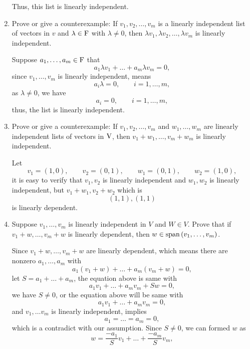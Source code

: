 \begin{enumerate}
\begin{solution}
            Thus, this list is linearly independent.
        \end{solution}
    \item Prove or give a counterexample: If $v_1, v_2, \ldots, v_m$ is a linearly independent list of vectors in $v$ and $\lambda \in \mathrm{F}$ with 
        $\lambda \neq 0$, then $\lambda v_1, \lambda v_2, \ldots, \lambda v_m$ is linearly independent.
        \begin{solution}
            Suppose $a_1, \ldots, a_m \in \mathrm{F}$ that 
            \[ a_1\lambda v_1 + \dots + a_m \lambda v_m = 0,\]
            since $v_1, \ldots, v_m$ is linearly independent, means 
            \[a_i\lambda = 0, \qquad i = 1, \ldots, m,\]
            as $\lambda \neq 0$, we have 
            \[ a_i =0, \qquad i=1,\ldots,m,\]
            thus, the list is linearly independent.
        \end{solution}
    \item Prove or give a counterexample: If $v_1, v_2, \ldots, v_m$ and $w_1, \ldots, w_m$ are linearly independent lists of vectors in $\mathrm{V}$,
        then $v_1 + w_1, \ldots, v_m + w_m$ is linearly independent.
        \begin{solution}
            Let 
            \[ v_1 = (1,0), \qquad v_2 = (0,1), \qquad w_1=(0,1), \qquad w_2=(1,0),\]
            it is easy to verify that $v_1, v_2$ is linearly independent and $w_1, w_2$ is linearly independent,
            but $v_1+w_1, v_2+w_2$ which is 
            \[ (1,1), (1,1)\]
            is linearly dependent.
        \end{solution}
    \item Suppose $v_1, \ldots, v_m$ is linearly independent in $V$ and $W \in V$. Prove that if $v_1 + w, \ldots, v_m +w$ is linearly dependent, 
        then $w \in \text{span}\left(v_1,\ldots,v_m\right)$.
        \begin{solution}
            Since $v_1 + w, \ldots, v_m + w$ are linearly dependent, which means there are nonzero $a_1, \ldots, a_m$ with 
            \[ a_1(v_1+w) + \dots + a_m(v_m + w)  = 0,\]
            let $S = a_1 + \dots + a_m$, the equation above is same with 
            \[ a_1v_1 + \dots + a_m v_m + Sw = 0,\]
            we have $S \neq 0$, or the equation above will be same with 
            \[ a_1 v_1 + \dots + a_mv_m = 0,\]
            and $v_1, \ldots v_m$ is linearly independent, implies 
            \[ a_1=\dots =a_m=0,\]
            which is a contradict with our assumption.
            Since $S \neq 0$, we can formed $w$ as 
            \[ w = \dfrac{-a_1}{S}v_1 + \dots + \dfrac{-a_m}{S}v_m ,\]

\end{solution}
\end{enumerate}
